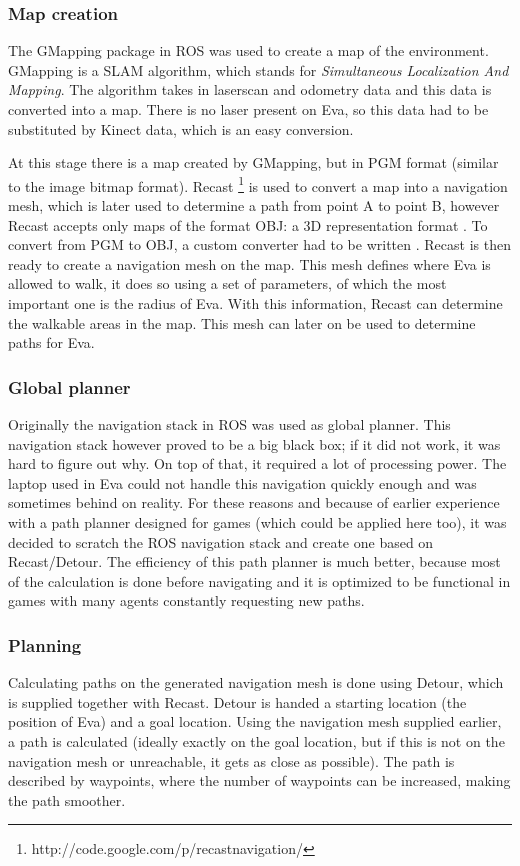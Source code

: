 \documentclass[project_eva.tex]{subfiles}
\begin{document}
\subsubsection*{Map creation}
The GMapping package in ROS was used to create a map of the environment. GMapping \cite{GMapping} is a SLAM algorithm, 
which stands for \textit{Simultaneous Localization And Mapping}. The algorithm takes in laserscan and odometry data and 
this data is converted into a map. There is no laser present on Eva, so this data had to be substituted by Kinect data, 
which is an easy conversion.

At this stage there is a map created by GMapping, but in PGM format (similar to the image bitmap format). Recast 
\footnote{http://code.google.com/p/recastnavigation/} is used to convert a map into a navigation mesh, which is later used to determine a path from point A to point B, however Recast accepts only maps of the format OBJ: a 3D representation 
format \cite{wavefront}. To convert from PGM to OBJ, a custom converter had to be written \cite{Tech} . Recast is then ready to create a navigation mesh on the map. This mesh defines where Eva is allowed to walk, it does so using a set of parameters, of which the most important one is the radius of Eva. With this information, Recast can determine the walkable areas in the map. This mesh can later on be used to determine paths for Eva.

\subsubsection*{Global planner}
Originally the navigation stack in ROS was used as global planner. This navigation stack however proved to be a big black box; if it did not work, it was hard to figure out why. On top of that, it required a lot of processing power. The laptop used in Eva could not handle this navigation quickly enough and was sometimes behind on reality. For these reasons and because of earlier experience with a path planner designed for games (which could be applied here too), it was decided to scratch the ROS navigation stack and create one based on Recast/Detour. The efficiency of this path planner is much better, because most of the calculation is done before navigating and it is optimized to be functional in games with many agents constantly requesting new paths.

\subsubsection*{Planning}
Calculating paths on the generated navigation mesh is done using Detour, which is supplied together with Recast. Detour is handed a starting location (the position of Eva) and a goal location. Using the navigation mesh supplied earlier, a path is calculated (ideally exactly on the goal location, but if this is not on the navigation mesh or unreachable, it gets as close as possible). The path is described by waypoints, where the number of waypoints can be increased, making the path smoother.
\end{document}
